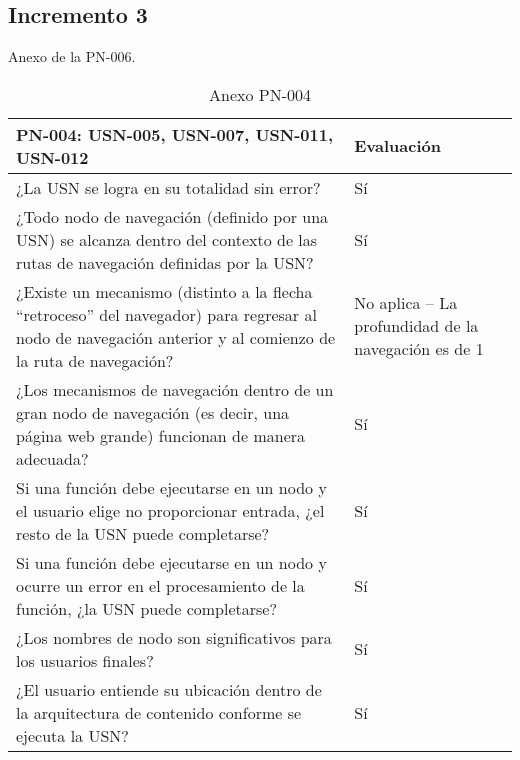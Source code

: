 \subsection{Incremento 3}

Anexo de la PN-006.

\begin{table}[htpb]
\centering
\begin{tabularx}{\textwidth}{|X|X|}
\hline
\textbf{PN-004: USN-005, USN-007, USN-011, USN-012}                                                                                                         & \textbf{Evaluación}                                 \\ \hline
¿La USN se logra en su totalidad sin error?                                                                                                                & Sí                                                  \\ \hline
¿Todo nodo de navegación (definido por una USN) se alcanza dentro del contexto de las rutas de navegación definidas por la USN?                            & Sí                                                  \\ \hline
¿Existe un mecanismo (distinto a la flecha ``retroceso'' del navegador) para regresar al nodo de navegación anterior y al comienzo de la ruta de navegación? & No aplica -- La profundidad de la navegación es de 1 \\ \hline
¿Los mecanismos de navegación dentro de un gran nodo de navegación (es decir, una página web grande) funcionan de manera adecuada?                         & Sí                                                  \\ \hline
Si una función debe ejecutarse en un nodo y el usuario elige no proporcionar entrada, ¿el resto de la USN puede completarse?                               & Sí                                                  \\ \hline
Si una función debe ejecutarse en un nodo y ocurre un error en el procesamiento de la función, ¿la USN puede completarse?                                  & Sí                                                  \\ \hline
¿Los nombres de nodo son significativos para los usuarios finales?                                                                                         & Sí                                                  \\ \hline
¿El usuario entiende su ubicación dentro de la arquitectura de contenido conforme se ejecuta la USN?                                                       & Sí                                                  \\ \hline
\end{tabularx}
\caption{Anexo PN-004}
\end{table}